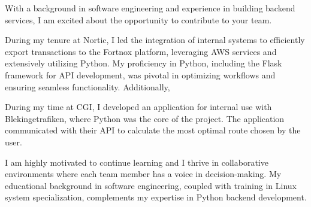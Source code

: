 With a background in software engineering and experience in building backend services, 
I am excited about the opportunity to contribute to your team.

\vspace{6pt}
During my tenure at Nortic, I led the integration of internal systems to efficiently export transactions to the Fortnox platform, 
leveraging AWS services and extensively utilizing Python. My proficiency in Python, including the Flask framework for API development, 
was pivotal in optimizing workflows and ensuring seamless functionality. Additionally, 

\vspace{6pt}
During my time at CGI, I developed an application for internal use with Blekingetrafiken, where Python was the core of the project. 
The application communicated with their API to calculate the most optimal route chosen by the user.

\vspace{6pt}
I am highly motivated to continue learning and I thrive in collaborative environments where each team member has a voice in decision-making. 
My educational background in software engineering, coupled with training in Linux system specialization, complements my expertise in Python backend development.